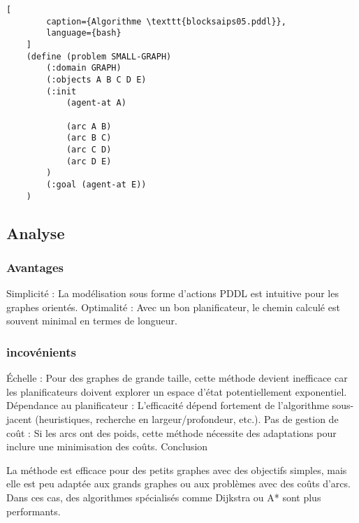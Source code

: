 \documentclass[../CSC_5RO16_TA_TP5.tex]{subfiles}
\begin{document}
\begin{scriptsize}\mycode
    \begin{lstlisting}[
        caption={Algorithme \texttt{blocksaips05.pddl}},
        language={bash}
    ]
    (define (problem SMALL-GRAPH)
        (:domain GRAPH)
        (:objects A B C D E)
        (:init 
            (agent-at A)

            (arc A B)
            (arc B C)
            (arc C D)
            (arc D E)
        )
        (:goal (agent-at E))
    )
    \end{lstlisting}
\end{scriptsize}

\subsection{Analyse}
\subsubsection{Avantages}
Simplicité : La modélisation sous forme d'actions PDDL est intuitive pour les graphes orientés.
Optimalité : Avec un bon planificateur, le chemin calculé est souvent minimal en termes de longueur.

\subsubsection{incovénients}
Échelle : Pour des graphes de grande taille, cette méthode devient inefficace car les planificateurs doivent explorer un espace d'état potentiellement exponentiel.
Dépendance au planificateur : L'efficacité dépend fortement de l'algorithme sous-jacent (heuristiques, recherche en largeur/profondeur, etc.).
Pas de gestion de coût : Si les arcs ont des poids, cette méthode nécessite des adaptations pour inclure une minimisation des coûts.
Conclusion

La méthode est efficace pour des petits graphes avec des objectifs simples, mais elle est peu adaptée aux grands graphes ou aux problèmes avec des coûts d'arcs. Dans ces cas, des algorithmes spécialisés comme Dijkstra ou A* sont plus performants.
\end{document}

